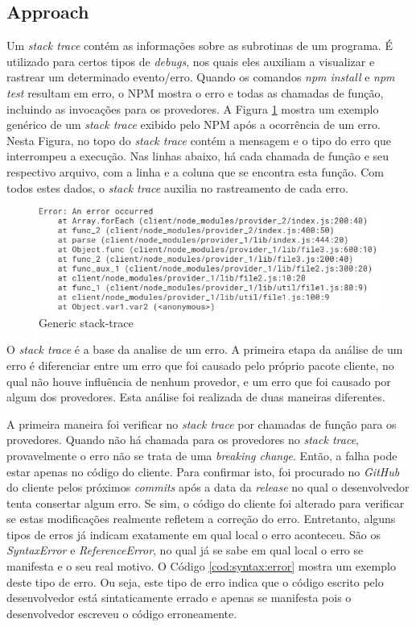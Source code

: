 \subsection{Approach}
\label{apr:rq1}

Um \textit{stack trace} contém as informações sobre as subrotinas de um programa. É utilizado para certos tipos de \textit{debugs}, nos quais eles auxiliam a visualizar e rastrear um determinado evento/erro. Quando os comandos \textit{npm install} e \textit{npm test} resultam em erro, o \Gls{NPM} mostra o erro e todas as chamadas de função, incluindo as invocações para os provedores. A Figura \ref{fig:trace} mostra um exemplo genérico de um \textit{stack trace} exibido pelo \Gls{NPM} após a ocorrência de um erro. Nesta Figura, no topo do \textit{stack trace} contém a mensagem e o tipo do erro que interrompeu a execução. Nas linhas abaixo, há cada chamada de função e seu respectivo arquivo, com a linha e a coluna que se encontra esta função. Com todos estes dados, o \textit{stack trace} auxilia no rastreamento de cada erro.

\begin{figure}
    \centering
    \includegraphics[scale=0.7]{figuras/stack_trace.jpeg}
    \caption{Generic stack-trace}
    \label{fig:trace}
\end{figure}{}

O \textit{stack trace} é a base da analise de um erro. A primeira etapa da análise de um erro é diferenciar entre um erro que foi causado pelo próprio pacote cliente, no qual não houve influência de nenhum provedor, e um erro que foi causado por algum dos provedores. Esta análise foi realizada de duas maneiras diferentes.

A primeira maneira foi verificar no \textit{stack trace} por chamadas de função para os provedores. Quando não há chamada para os provedores no \textit{stack trace}, provavelmente o erro não se trata de uma \textit{breaking change}. Então, a falha pode estar apenas no código do cliente. Para confirmar isto, foi procurado no \textit{GitHub} do cliente pelos próximos \textit{commits} após a data da \textit{release} no qual o desenvolvedor tenta consertar algum erro. Se sim, o código do cliente foi alterado para verificar se estas modificações realmente refletem a correção do erro. Entretanto, alguns tipos de erros já indicam exatamente em qual local o erro aconteceu. São os \textit{SyntaxError} e \textit{ReferenceError}, no qual já se sabe em qual local o erro se manifesta e o seu real motivo. O Código \ref{cod:syntax:error} mostra um exemplo deste tipo de erro. Ou seja, este tipo de erro indica que o código escrito pelo desenvolvedor está sintaticamente errado e apenas se manifesta pois o desenvolvedor escreveu o código erroneamente.

